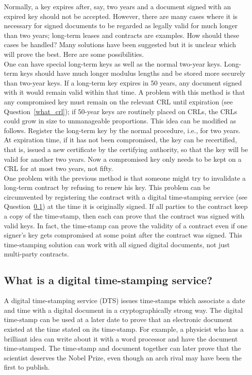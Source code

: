 Normally, a key expires after, say, two years and a document signed
with an expired key should not be accepted. However, there are many
cases where it is necessary for signed documents to be regarded as
legally valid for much longer than two years; long-term leases and
contracts are examples. How should these cases be handled? Many
solutions have been suggested but it is unclear which will prove the
best. Here are some possibilities.\\

One can have special long-term keys as well as the normal two-year keys.
Long-term keys should have much longer modulus lengths and be stored more
securely than two-year keys. If a long-term key expires in 50 years, any
document signed with it would remain valid within that time. A problem with
this method is that any compromised key must remain on the relevant CRL
until expiration (see Question~\ref{what_crl}); if 50-year keys are
routinely placed on CRLs, the CRLs could grow in size to unmanageable
proportions. This idea can be modified as follows.  Register the long-term
key by the normal procedure, i.e., for two years. At expiration time, if it
has not been compromised, the key can be recertified, that is, issued a new
certificate by the certifying authority, so that the key will be valid for
another two years. Now a compromised key only needs to be kept on a CRL for
at most two years, not fifty.\\

One problem with the previous method is that someone might try to
invalidate a long-term contract by refusing to renew his key. This problem
can be circumvented by registering the contract with a digital
time-stamping service (see Question~\ref{what_ts}) at the time it is
originally signed. If all parties to the contract keep a copy of the
time-stamp, then each can prove that the contract was signed with valid
keys. In fact, the time-stamp can prove the validity of a contract even if
one signer's key gets compromised at some point after the contract was
signed. This time-stamping solution can work with all signed digital
documents, not just multi-party contracts.

\subsection{What is a digital time-stamping service?}
\label{what_ts}

A digital time-stamping service (DTS) issues time-stamps which
associate a date and time with a digital document in a
cryptographically strong way. The digital time-stamp can be used at a
later date to prove that an electronic document existed at the time
stated on its time-stamp. For example, a physicist who has a brilliant
idea can write about it with a word processor and have the document
time-stamped. The time-stamp and document together can later prove that
the scientist deserves the Nobel Prize, even though an arch rival may
have been the first to publish.\\

